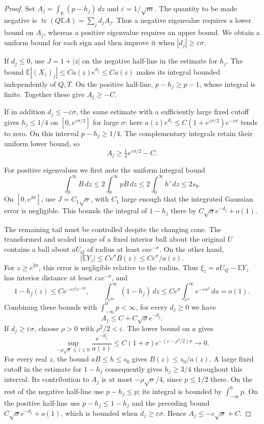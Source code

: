\begin{proof}
Set \(A_j=\int_{\mathbb R}(p-h_j)\,dz\) and
\(\varepsilon=1/\sqrt m\). The quantity to be made negative is
\(\operatorname{tr}(Q\mathbb EA)=\sum_jd_jA_j\).
Thus a negative eigenvalue requires a lower bound on \(A_j\), whereas
a positive eigenvalue requires an upper bound. We obtain a uniform bound
for each sign and then improve it when \(|d_j|\ge\varepsilon\sigma\).

If \(d_j\le0\), use \(J=1+|z|\) on the negative half-line in the
estimate for \(h_j\). The bound
\(\mathbb E|(X_z)_j|\le Ca(z)e^{d_j}\le Ca(z)\) makes its integral
bounded independently of \(Q,T\). On the positive half-line,
\(p-h_j\ge p-1\), whose integral is finite. Together these give
\(A_j\ge-C\).

If in addition \(d_j\le-\varepsilon\sigma\), the same estimate with
a sufficiently large fixed cutoff gives \(h_j\le1/4\) on
\([0,e^{\varepsilon\sigma/2}]\) for large \(\sigma\): here
\(a(z)e^{d_j}\le C(1+e^{\varepsilon\sigma/2})e^{-\varepsilon\sigma}\)
tends to zero. On this interval \(p-h_j\ge1/4\). The complementary
integrals retain their uniform lower bound, so
\[
A_j\ge\tfrac14e^{\varepsilon\sigma/2}-C.
\]

For positive eigenvalues we first note the uniform integral bound
\[
\int_0^\infty B\,dz\le2\int_0^\infty pB\,dz
\le2\int_0^\infty h'\,dz\le2s_0.
\]
On \([0,e^{2\sigma}]\), use \(J=C_1\sqrt\sigma\), with \(C_1\) large enough that the integrated Gaussian error is negligible. This bounds the integral of \(1-h_j\) there by \(C\sqrt\sigma e^{-d_j}+o(1)\).

The remaining tail must be controlled despite the changing cone. The transformed and scaled image of a fixed interior ball about the original \(U\) contains a ball about \(aU_Q\) of radius at least \(cae^{-\sigma}\). On the other hand,
\[
|\mathbb EY_z|\le Ce^\sigma B(z)\le Ce^\sigma/a(z).
\]
For \(z\ge e^{2\sigma}\), this error is negligible relative to the radius. Thus \(\xi_z=aU_Q-\mathbb EY_z\) has interior distance at least \(cze^{-\sigma}\), and
\[
1-h_j(z)\le C e^{-cz^2e^{-2\sigma}},\qquad
\int_{e^{2\sigma}}^\infty(1-h_j)\,dz
\le Ce^\sigma\int_{e^\sigma}^\infty e^{-cu^2}\,du=o(1).
\]
Combining these bounds with \(\int_{-\infty}^0p<\infty\), for every \(d_j\ge0\) we have
\[
A_j\le C+C\sqrt\sigma e^{-d_j}.
\]
If \(d_j\ge\varepsilon\sigma\), choose \(\rho>0\) with \(\rho^2/2<\varepsilon\). The lower bound on \(a\) gives
\[
\sup_{-\rho\sqrt\sigma\le z\le0}\frac{e^{-d_j}}{a(z)}
\le C(1+\sigma)e^{-(\varepsilon-\rho^2/2)\sigma}\longrightarrow0.
\]
For every real \(z\), the bound \(aB\le h\le s_0\) gives
\(B(z)\le s_0/a(z)\). A large fixed cutoff in the estimate for
\(1-h_j\) consequently gives
\(h_j\ge3/4\) throughout this interval. Its contribution to \(A_j\)
is at most \(-\rho\sqrt\sigma/4\), since \(p\le1/2\) there.
On the rest of the negative half-line use \(p-h_j\le p\); its
integral is bounded by \(\int_{-\infty}^0p\). On the positive
half-line use \(p-h_j\le1-h_j\) and the preceding bound
\(C\sqrt\sigma e^{-d_j}+o(1)\), which is bounded when
\(d_j\ge\varepsilon\sigma\). Hence
\(A_j\le-c\sqrt\sigma+C\).


\end{proof}
